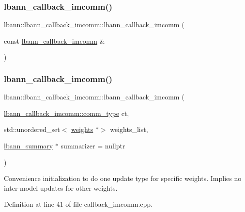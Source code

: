 \subsubsection{\texorpdfstring{lbann\+\_\+callback\+\_\+imcomm()}{lbann\_callback\_imcomm()}\hspace{0.1cm}{\footnotesize\ttfamily [2/3]}}
{\footnotesize\ttfamily lbann\+::lbann\+\_\+callback\+\_\+imcomm\+::lbann\+\_\+callback\+\_\+imcomm (\begin{DoxyParamCaption}\item[{const \hyperlink{classlbann_1_1lbann__callback__imcomm}{lbann\+\_\+callback\+\_\+imcomm} \&}]{ }\end{DoxyParamCaption})\hspace{0.3cm}{\ttfamily [default]}}

\mbox{\label{classlbann_1_1lbann__callback__imcomm_aadc785d2f27ad0b03fce8c2785cff4fb}} 
\subsubsection{\texorpdfstring{lbann\+\_\+callback\+\_\+imcomm()}{lbann\_callback\_imcomm()}\hspace{0.1cm}{\footnotesize\ttfamily [3/3]}}
{\footnotesize\ttfamily lbann\+::lbann\+\_\+callback\+\_\+imcomm\+::lbann\+\_\+callback\+\_\+imcomm (\begin{DoxyParamCaption}\item[{\hyperlink{classlbann_1_1lbann__callback__imcomm_acf7e894b3381e7f9b71020dc73594d6a}{lbann\+\_\+callback\+\_\+imcomm\+::comm\+\_\+type}}]{ct,  }\item[{std\+::unordered\+\_\+set$<$ \hyperlink{classlbann_1_1weights}{weights} $\ast$$>$}]{weights\+\_\+list,  }\item[{\hyperlink{classlbann_1_1lbann__summary}{lbann\+\_\+summary} $\ast$}]{summarizer = {\ttfamily nullptr} }\end{DoxyParamCaption})}

Convenience initialization to do one update type for specific weights. Implies no inter-\/model updates for other weights. 

Definition at line 41 of file callback\+\_\+imcomm.\+cpp.


